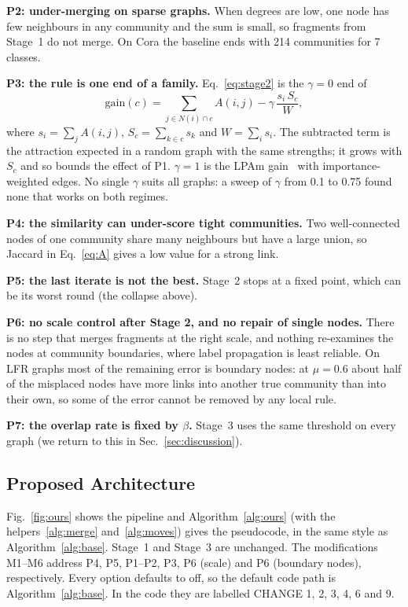 \documentclass[conference]{IEEEtran}
\begin{document}
\textbf{P2: under-merging on sparse graphs.} When degrees are low, one node has few neighbours in any community and the sum is small, so fragments from Stage~1 do not merge. On Cora the baseline ends with 214 communities for 7 classes.

\textbf{P3: the rule is one end of a family.} Eq.~\eqref{eq:stage2} is the $\gamma=0$ end of
\begin{equation}
\mathrm{gain}(c)=\sum_{j\in N(i)\cap c}A(i,j)-\gamma\,\frac{s_i\,S_c}{W},\label{eq:gain}
\end{equation}
where $s_i=\sum_jA(i,j)$, $S_c=\sum_{k\in c}s_k$ and $W=\sum_is_i$. The subtracted term is the attraction expected in a random graph with the same strengths; it grows with $S_c$ and so bounds the effect of P1. $\gamma=1$ is the LPAm gain~\cite{barber2009} with importance-weighted edges. No single $\gamma$ suits all graphs: a sweep of $\gamma$ from 0.1 to 0.75 found none that works on both regimes.

\textbf{P4: the similarity can under-score tight communities.} Two well-connected nodes of one community share many neighbours but have a large union, so Jaccard in Eq.~\eqref{eq:A} gives a low value for a strong link.

\textbf{P5: the last iterate is not the best.} Stage~2 stops at a fixed point, which can be its worst round (the collapse above).

\textbf{P6: no scale control after Stage 2, and no repair of single nodes.} There is no step that merges fragments at the right scale, and nothing re-examines the nodes at community boundaries, where label propagation is least reliable. On LFR graphs most of the remaining error is boundary nodes: at $\mu=0.6$ about half of the misplaced nodes have more links into another true community than into their own, so some of the error cannot be removed by any local rule.

\textbf{P7: the overlap rate is fixed by $\beta$.} Stage~3 uses the same threshold on every graph (we return to this in Sec.~\ref{sec:discussion}).

\subsection{Proposed Architecture}\label{sec:arch}
Fig.~\ref{fig:ours} shows the pipeline and Algorithm~\ref{alg:ours} (with the helpers~\ref{alg:merge} and~\ref{alg:moves}) gives the pseudocode, in the same style as Algorithm~\ref{alg:base}. Stage~1 and Stage~3 are unchanged. The modifications M1--M6 address P4, P5, P1--P2, P3, P6 (scale) and P6 (boundary nodes), respectively. Every option defaults to off, so the default code path is Algorithm~\ref{alg:base}. In the code they are labelled CHANGE 1, 2, 3, 4, 6 and 9.
\end{document}
